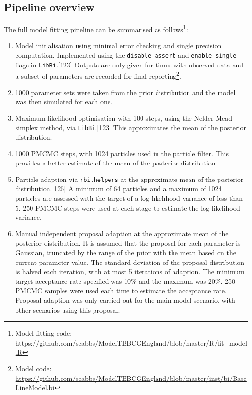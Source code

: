 \documentclass[11pt,twoside]{bristolthesis}
\begin{document}
  \hypertarget{pipeline-overview}{%
  \subsection{Pipeline overview}\label{pipeline-overview}}
  
  The full model fitting pipeline can be summarised as follows\footnote{Model fitting code: \url{https://github.com/seabbs/ModelTBBCGEngland/blob/master/R/fit_model.R}}:
  \begin{enumerate}
  \def\labelenumi{\arabic{enumi}.}
  \item
    Model initialisation using minimal error checking and single precision computation. Implemented using the \texttt{disable-assert} and \texttt{enable-single} flags in \texttt{LibBi}.{[}\protect\hyperlink{ref-Murray2015}{123}{]} Outputs are only given for times with observed data and a subset of parameters are recorded for final reporting\footnote{Model code: \url{https://github.com/seabbs/ModelTBBCGEngland/blob/master/inst/bi/BaseLineModel.bi}}.
  \item
    1000 parameter sets were taken from the prior distribution and the model was then simulated for each one.
  \item
    Maximum likelihood optimisation with 100 steps, using the Nelder-Mead simplex method, via \texttt{LibBi}.{[}\protect\hyperlink{ref-Murray2015}{123}{]} This approximates the mean of the posterior distribution.
  \item
    1000 PMCMC steps, with 1024 particles used in the particle filter. This provides a better estimate of the mean of the posterior distribution.
  \item
    Particle adaption via \texttt{rbi.helpers} at the approximate mean of the posterior distribution.{[}\protect\hyperlink{ref-Funk:2019uw}{125}{]} A minimum of 64 particles and a maximum of 1024 particles are assessed with the target of a log-likelihood variance of less than 5. 250 PMCMC steps were used at each stage to estimate the log-likelihood variance.
  \item
    Manual independent proposal adaption at the approximate mean of the posterior distribution. It is assumed that the proposal for each parameter is Gaussian, truncated by the range of the prior with the mean based on the current parameter value. The standard deviation of the proposal distribution is halved each iteration, with at most 5 iterations of adaption. The minimum target acceptance rate specified was 10\% and the maximum was 20\%. 250 PMCMC samples were used each time to estimate the acceptance rate. Proposal adaption was only carried out for the main model scenario, with other scenarios using this proposal.

\end{enumerate}
\end{document}
